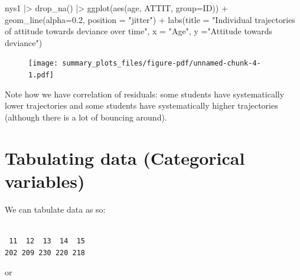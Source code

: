 \documentclass[
  letterpaper,
  DIV=11,
  numbers=noendperiod]{scrreprt}
\newenvironment{Shaded}{\begin{snugshade}}{\end{snugshade}}
\newcommand{\AttributeTok}[1]{\textcolor[rgb]{0.49,0.56,0.16}{#1}}
\newcommand{\FloatTok}[1]{\textcolor[rgb]{0.25,0.63,0.44}{#1}}
\newcommand{\FunctionTok}[1]{\textcolor[rgb]{0.02,0.16,0.49}{#1}}
\newcommand{\NormalTok}[1]{\textcolor[rgb]{0.00,0.44,0.13}{#1}}
\newcommand{\SpecialCharTok}[1]{\textcolor[rgb]{0.25,0.44,0.63}{#1}}
\newcommand{\StringTok}[1]{\textcolor[rgb]{0.25,0.44,0.63}{#1}}
\begin{document}
\begin{Shaded}
\begin{Highlighting}[]
\NormalTok{nys1 }\SpecialCharTok{|\textgreater{}} 
  \FunctionTok{drop\_na}\NormalTok{() }\SpecialCharTok{|\textgreater{}} 
  \FunctionTok{ggplot}\NormalTok{(}\FunctionTok{aes}\NormalTok{(age, ATTIT, }\AttributeTok{group=}\NormalTok{ID)) }\SpecialCharTok{+}
    \FunctionTok{geom\_line}\NormalTok{(}\AttributeTok{alpha=}\FloatTok{0.2}\NormalTok{, }\AttributeTok{position =} \StringTok{"jitter"}\NormalTok{) }\SpecialCharTok{+} 
    \FunctionTok{labs}\NormalTok{(}\AttributeTok{title =} \StringTok{"Individual trajectories of attitude towards deviance over time"}\NormalTok{,}
         \AttributeTok{x =} \StringTok{"Age"}\NormalTok{,}
         \AttributeTok{y =}\StringTok{"Attitude towards deviance"}\NormalTok{)}
\end{Highlighting}
\end{Shaded}

\begin{figure}[H]

{\centering \texttt{[image: summary\_plots\_files/figure-pdf/unnamed-chunk-4-1.pdf]}

}

\end{figure}

Note how we have correlation of residuals: some students have
systematically lower trajectories and some students have systematically
higher trajectories (although there is a lot of bouncing around).

\hypertarget{tabulating-data-categorical-variables}{%
\section{Tabulating data (Categorical
variables)}\label{tabulating-data-categorical-variables}}

We can tabulate data as so:

\begin{Shaded}
\end{Shaded}

\begin{verbatim}

 11  12  13  14  15 
202 209 230 220 218 
\end{verbatim}

or
\end{document}
